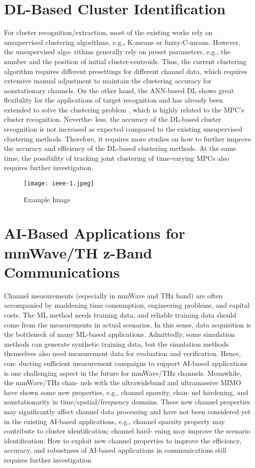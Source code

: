 \documentclass[conference]{IEEEtran}
\begin{document}
\section{DL-Based Cluster Identification}
For cluster recognition/extraction,\cite{33} most of the existing
works rely on unsupervised clustering algorithms, e.g.,
K-means or fuzzy-C-means. However, the unsupervised algo-
rithms generally rely on preset parameters, e.g., the number
and the position of initial cluster-centroids. Thus, the current
clustering algorithm requires different presettings for different
channel data, which requires extensive manual adjustment to
maintain the clustering accuracy for nonstationary channels.
On the other hand, the ANN-based DL shows great flexibility
for the applications of target recognition and has already been
extended to solve the clustering problem , which
is highly related to the MPC’s cluster recognition. Neverthe-
less, the accuracy of the DL-based cluster recognition is not
increased as expected compared to the existing unsupervised
clustering methods. Therefore, it requires more studies on
how to further improve the accuracy and efficiency of the
DL-based clustering methods. At the same time, the possibility
of tracking joint clustering of time-varying MPCs also requires
further investigation.


\begin{figure}[h]
    \centering
    \texttt{[image: ieee-1.jpeg]}
    \caption{Example Image}
    \label{fig:example}
\end{figure}

\section{AI-Based Applications for mmWave/TH z-Band Communications}
Channel measurements\cite{22} (especially in mmWave and THz
band) are often accompanied by maddening time consumption,
engineering problems, and capital costs. The ML method
needs training data, and reliable training data should come
from the measurements in actual scenarios. In this sense, data
acquisition is the bottleneck of many ML-based applications.
Admittedly, some simulation methods can generate synthetic
training data, but the simulation methods themselves also need
measurement data for evaluation and verification. Hence, con-
ducting sufficient measurement campaigns to support AI-based
applications is one challenging aspect in the future for
mmWave/THz channels. Meanwhile, the mmWave/THz chan-
nels with the ultrawideband and ultramassive MIMO have
shown some new properties, e.g., channel sparsity, chan-
nel hardening, and nonstationarity in time/spatial/frequency
domains. These new channel properties may significantly
affect channel data processing and have not been considered
yet in the existing AI-based applications, e.g., channel sparsity
property may contribute to cluster identification; channel hard-
ening may improve the scenario identification. How to exploit
new channel properties to improve the efficiency, accuracy,
and robustness of AI-based applications in communications
still requires further investigation
\end{document}
